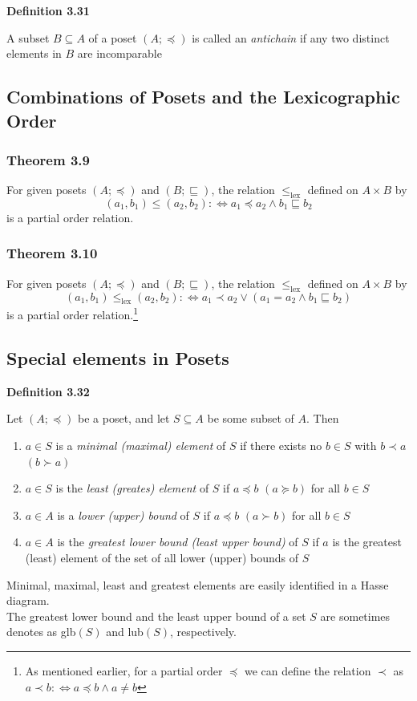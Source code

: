 \documentclass[a4paper]{report}
\newenvironment{definition}[1]{\begin{framed}\centerline{\textbf{Definition #1}}\noindent\hspace{-1.1mm}}{\end{framed}}
\begin{document}
\begin{definition}{3.31}
A subset $B\subseteq A$ of a poset $(A;\preceq)$ is called an \emph{antichain} if any two distinct elements in $B$ are incomparable
\end{definition}

\subsection{Combinations of Posets and the Lexicographic Order}
\subsubsection*{Theorem 3.9}
For given posets $(A;\preceq)$ and $(B;\sqsubseteq)$, the relation $\leq_\text{lex}$ defined on $A\times B$ by \[(a_1,b_1)\leq (a_2,b_2):\Longleftrightarrow a_1\preceq a_2\land b_1\sqsubseteq b_2\]
is a partial order relation.

\subsubsection*{Theorem 3.10}
For given posets $(A;\preceq)$ and $(B;\sqsubseteq)$, the relation $\leq_\text{lex}$ defined on $A\times B$ by \[(a_1,b_1)\leq_\text{lex} (a_2,b_2):\Longleftrightarrow a_1\prec a_2\lor (a_1=a_2\land b_1\sqsubseteq b_2)\]
is a partial order relation.\footnote{As mentioned earlier, for a partial order $\preceq$ we can define the relation $\prec$ as $a\prec b:\Longleftrightarrow a\preceq b\land a\not=b$}

\subsection{Special elements in Posets}
\begin{definition}{3.32}
Let $(A;\preceq)$ be a poset, and let $S\subseteq A$ be some subset of $A$. Then 
\begin{enumerate}
\item $a\in S$ is a \emph{minimal (maximal) element} of $S$ if there exists no $b\in S$ with $b\prec a$ $(b\succ a)$
\item $a\in S$ is the \emph{least (greates) element} of $S$ if $a\preceq b$ $(a\succeq b)$ for all $b\in S$
\item $a\in A$ is a \emph{lower (upper) bound} of $S$ if $a\preceq b$ $(a\succ b)$ for all $b\in S$
\item $a\in A$ is the \emph{greatest lower bound (least upper bound)} of $S$ if $a$ is the greatest (least) element of the set of all lower (upper) bounds of $S$ 
\end{enumerate}
\end{definition}
Minimal, maximal, least and greatest elements are easily identified in a Hasse diagram. \\
\indent The greatest lower bound and the least upper bound of a set $S$ are sometimes denotes as glb$(S)$ and lub$(S)$, respectively. 
\end{document}
